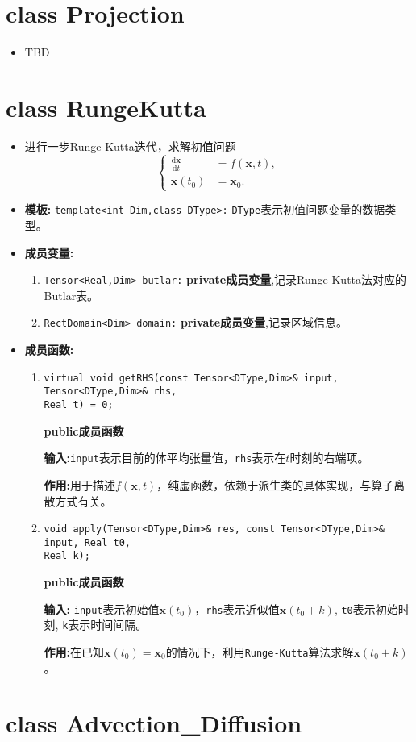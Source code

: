 \documentclass[UTF8]{ctexart}
\theoremstyle{plain}
\theoremstyle{definition}
\theoremstyle{remark}
\newcommand{\dif}{\mathrm{d}}
\newcommand{\difFrac}[2]{\frac{\dif #1}{\dif #2}}
\begin{document}
\section{class Projection}
\begin{itemize}
    \item TBD
\end{itemize}
\section{class RungeKutta}
\begin{itemize}
    \item 进行一步Runge-Kutta迭代，求解初值问题
    \begin{equation}
        \left\{
            \begin{aligned}
        \difFrac{\mathbf{x}}{t}&=f(\mathbf{x},t),\\
        \mathbf{x}(t_{0})&=\mathbf{x}_{0}.
            \end{aligned}
        \right.
    \end{equation}
    \item \textbf{模板:} \texttt{template<int Dim,class DType>:} \texttt{DType}表示初值问题变量的数据类型。
    \item \textbf{成员变量:}
    \begin{enumerate}
        \item \texttt{Tensor<Real,Dim> butlar:} \textbf{private成员变量},记录Runge-Kutta法对应的Butlar表。
        \item \texttt{RectDomain<Dim> domain:} \textbf{private成员变量},记录区域信息。
    \end{enumerate}
    \item \textbf{成员函数:}
    \begin{enumerate}
        \item \texttt{virtual void getRHS(const Tensor<DType,Dim>\& input, Tensor<DType,Dim>\& rhs, \\Real t) = 0;}
        
        \textbf{public成员函数}

        \textbf{输入:}\texttt{input}表示目前的体平均张量值，\texttt{rhs}表示在$t$时刻的右端项。

        \textbf{作用:}用于描述$f(\mathbf{x},t)$，纯虚函数，依赖于派生类的具体实现，与算子离散方式有关。
        \item \texttt{void apply(Tensor<DType,Dim>\& res, const Tensor<DType,Dim>\& input, Real t0,\\ Real k);}
        
        \textbf{public成员函数}

        \textbf{输入:} \texttt{input}表示初始值$\textbf{x}(t_{0})$，\texttt{rhs}表示近似值$\textbf{x}(t_{0}+k)$, \texttt{t0}表示初始时刻, \texttt{k}表示时间间隔。

        \textbf{作用:}在已知$\mathbf{x}(t_{0})=\mathbf{x}_{0}$的情况下，利用\texttt{Runge-Kutta}算法求解$\mathbf{x}(t_{0}+k)$。
    \end{enumerate}
\end{itemize}
\section{class Advection_Diffusion}
\end{document}
